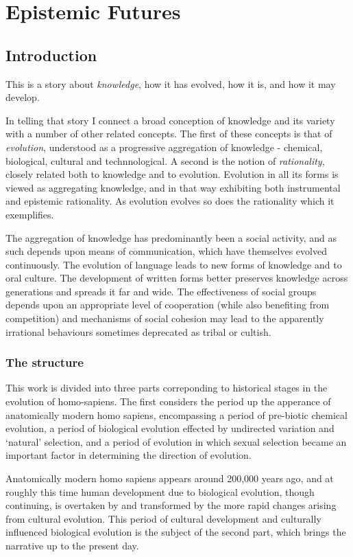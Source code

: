 \documentclass[10pt,titlepage]{book}
\begin{document}
\chapter{Epistemic Futures}

\section{Introduction}

This is a story about \emph{knowledge}, how it has evolved, how it is, and how it may develop.

In telling that story I connect a broad conception of knowledge and its variety with a number of other related concepts.
The first of these concepts is that of \emph{evolution}, understood as a progressive aggregation of knowledge -  chemical, biological, cultural and technnological.
A second is the notion of \emph{rationality}, closely related both to knowledge and to evolution.
Evolution in all its forms is viewed as aggregating knowledge, and in that way exhibiting both instrumental and epistemic rationality.
As evolution evolves so does the rationality which it exemplifies.

The aggregation of knowledge has predominantly been a social activity, and as such depends upon means of communication, which have themselves evolved continuously.
The evolution of language leads to new forms of knowledge and to oral culture.
The development of written forms better preserves knowledge across generations and spreads it far and wide.
The effectiveness of social groups depends upon an appropriate level of cooperation (while also benefiting from competition) and mechanisms of social cohesion may lead to the apparently irrational behaviours sometimes deprecated as tribal or cultish.

\subsection{The structure}

This work is divided into three parts correponding to historical stages in the evolution of homo-sapiens.
The first considers the period up the apperance of anatomically modern homo sapiens, encompassing a period of pre-biotic chemical evolution, a period of biological evolution effected by undirected variation and `natural' selection, and a period of evolution in which sexual selection became an important factor in determining the direction of evolution.

Anatomically modern homo sapiens appears around 200,000 years ago, and at roughly this time human development due to biological evolution, though continuing, is overtaken by and transformed by the more rapid changes arising from cultural evolution.
This period of cultural development and culturally influenced biological evolution is the subject of the second part, which brings the narrative up to the present day.
\end{document}

